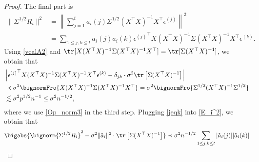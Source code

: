 \documentclass[aos,preprint]{imsart}
\begin{document}
\begin{proof}
\medskip
	  The final part is %
	\begin{align}
	\|\Sigma^{1/2}R_i\|^2 &= \left\|\sum_{j=1}^t  {a}_i(j) \Sigma^{1/2}(X^{\top} X)^{-1} X^{\top} \epsilon^{(j)}\right\|^2 \nonumber\\
	& = \sum_{1\le j , k \le t} a_i(j)  a_i(k)  {\epsilon^{(j)}}^\top X(X^{\top} X)^{-1}\Sigma (X^{\top} X)^{-1} X^{\top} {\epsilon^{(k)}}.\label{E_i^2}
	\end{align}	
	Using \eqref{vcalA2} and $\tr[X(X^{\top} X)^{-1}\Sigma (X^{\top} X)^{-1} X^{\top}]=\tr[ \Sigma (X^{\top} X)^{-1}] $, we obtain that %
	\begin{align}
	& \left|{\epsilon^{(j)}}^\top X(X^{\top} X)^{-1}\Sigma (X^{\top} X)^{-1} X^{\top} {\epsilon^{(k)}} -\delta_{jk}\cdot \sigma^2\tr\left[\Sigma(X^\top X)^{-1}\right]\right|\nonumber \\
	& \prec \sigma^2  \bignormFro{X(X^{\top} X)^{-1}\Sigma (X^{\top} X)^{-1} X^{\top} } = \sigma^2  \bignormFro{\Sigma^{1/2}(X^{\top} X)^{-1}\Sigma^{1/2}} \nonumber\\
	 & \lesssim \sigma^2 p^{1/2} n^{-1} \le  \sigma^2  n^{-1/2 }, \label{jeqk}
	\end{align}
	where we use \eqref{Op_norm3} in the third step.
	Plugging \eqref{jeqk} into \eqref{E_i^2}, we obtain that 
	\begin{align*}
		\bigabs{\bignorm{\Sigma^{1/2} R_i}^2 -  \sigma^2 \|\hat a_i\|^2 \cdot\tr\left[\Sigma(X^\top X)^{-1}\right]} &\prec  \sigma^2  n^{-1/2 }  \sum_{1\le j,k\le t}|\hat a_i(j)||\hat a_i(k)| \\

\end{align*}
\end{proof}
\end{document}
